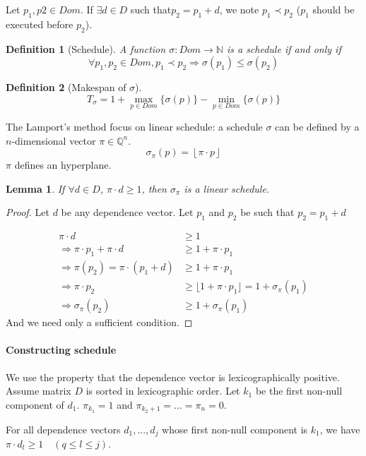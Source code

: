 \documentclass{article}
\newtheorem{lemma}{Lemma}
\newtheorem{defi}{Definition}
\begin{document}
Let $p_1,p2 \in Dom$. If $\exists d \in D$ such that$p_2=p_1 + d$, we note $p_1 \prec p_2$ ($p_1$ should be executed before $p_2$).

\begin{defi}[Schedule]
A function $\sigma : Dom \to \mathbb{N}$ is a schedule if and only if
\[\forall p_1,p_2 \in Dom, p_1\prec p_2 \Rightarrow \sigma(p_1)\leq \sigma(p_2)\]
\end{defi}

\begin{defi}[Makespan of $\sigma$]
\[T_{\sigma}=1+\max_{p\in Dom} \{ \sigma(p)\} - \min_{p\in Dom}\{ \sigma(p)\}\]
\end{defi}

The Lamport's method focus on linear schedule: a schedule $\sigma$ can be defined by a $n$-dimensional vector $\pi \in \mathbb{Q}^n$.
\[\sigma_\pi(p) = \left\lfloor \pi \cdot p \right\rfloor\]
$\pi$ defines an hyperplane.

\begin{lemma}
If $\forall d\in D$, $\pi\cdot d \geq 1$, then $\sigma_\pi$ is a linear schedule.
\end{lemma}

\begin{proof}
Let $d$ be any dependence vector. Let $p_1$ and $p_2$ be such that $p_2=p_1+d$

\begin{align*}
\pi \cdot d & \geq 1\\
\Rightarrow \pi\cdot p_1 + \pi \cdot d & \geq 1 + \pi \cdot p_1\\
\Rightarrow \pi(p_2)=\pi\cdot(p_1+d) & \geq 1 + \pi \cdot p_1\\
\Rightarrow \pi\cdot p_2 & \geq \lfloor 1 + \pi \cdot p_1 \rfloor = 1 + \sigma_\pi(p_1)\\
\Rightarrow \sigma_\pi(p_2) & \geq 1 + \sigma_\pi(p_1)
\end{align*}
And we need only a sufficient condition.
\end{proof}

\paragraph{Constructing schedule}
We use the property that the dependence vector is lexicographically positive. Assume matrix $D$ is sorted in lexicographic order. Let $k_1$ be the first non-null component of $d_1$. $\pi_{k_1}=1$ and $\pi_{k_{2}+1}=...=\pi_n=0$.

For all dependence vectors $d_1,...,d_j$ whose first non-null component is $k_1$, we have $\pi \cdot d_l \geq 1\quad (q\leq l \leq j)$.
\end{document}
